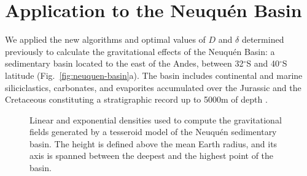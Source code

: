 \documentclass[extra, referee]{gji}
\begin{document}

\section{Application to the Neuqu\'en Basin}

We applied the new algorithms and optimal values of $D$ and $\delta$ determined
previously to calculate the gravitational effects of the Neuqu\'en Basin:
a sedimentary basin
located to the east of the Andes, between 32$^\circ$S and 40$^\circ$S latitude
(Fig.~\ref{fig:neuquen-basin}a).
The basin includes continental and marine siliciclastics, carbonates, and evaporites
accumulated over the Jurassic and the Cretaceous constituting a stratigraphic record up
to 5000m of depth \citep{Howell2005}.

\begin{figure}
\centering
{}
\caption{
    Linear and exponential densities used to compute the gravitational fields generated
    by a tesseroid model of the Neuqu\'en sedimentary basin.
    The height is defined above the mean Earth radius, and its axis is spanned between
    the deepest and the highest point of the basin.
}
\label{fig:neuquen-basin-densities}
\end{figure}
\end{document}
